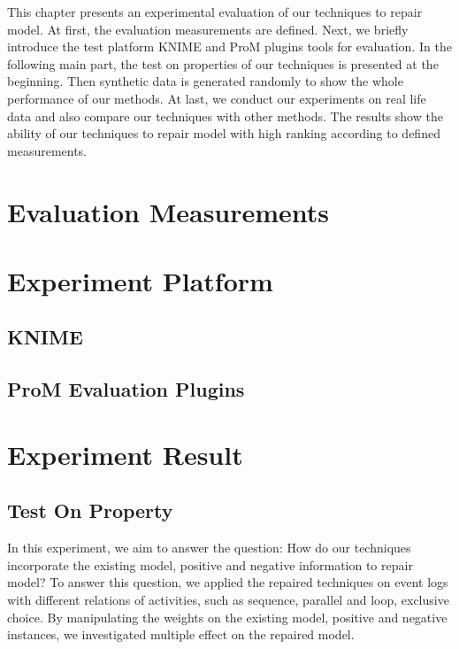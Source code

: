This chapter presents an experimental evaluation of our techniques to repair model. At first, the evaluation measurements are defined. Next, we briefly introduce the test platform KNIME and ProM plugins tools for evaluation. In the following main part, the test on properties of our techniques is presented at the beginning. Then synthetic data is generated randomly to show the whole performance of our methods. At last, we conduct our experiments on real life data and also compare our techniques with other methods. The results show the ability of our techniques to repair model with high ranking according to defined measurements.
\section{Evaluation Measurements}

\section{Experiment Platform}
\subsection{KNIME}
\subsection{ProM Evaluation Plugins}

\section{Experiment Result}
\subsection{Test On Property}
In this experiment, we aim to answer the question: How do our techniques incorporate the existing model, positive and negative information to repair model? 
To answer this question, we applied the repaired techniques on event logs with different relations of activities, such as sequence, parallel and loop, exclusive choice. By manipulating the weights on the existing model, positive and negative instances, we investigated multiple effect on the repaired model.
